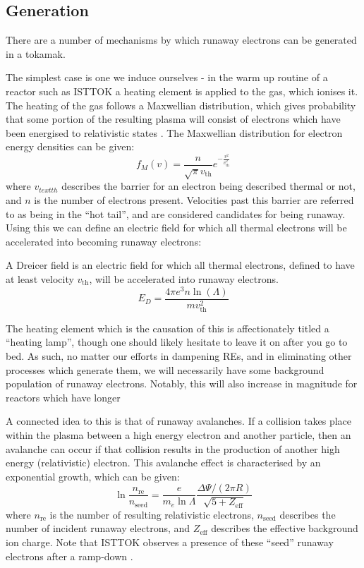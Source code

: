 \subsection{Generation}

There are a number of mechanisms by which runaway electrons can be generated in a tokamak.

The simplest case is one we induce ourselves - in the warm up routine of a reactor such as ISTTOK a heating element 
is applied to the gas, which ionises it. The heating of the gas follows a Maxwellian distribution, which 
gives probability that some portion of the resulting plasma will consist of electrons which have been 
energised to relativistic states \cite{runaway-electrons}. The Maxwellian distribution for electron energy densities 
can be given:
$$f_{M}(v) = \frac{n}{\sqrt{\pi} v_{\text{th}}} e^{-\frac{v^2}{v_{\text{th}}^2}}$$
where $v_{text{th}}$ describes the barrier for an electron being described thermal or not, and $n$ is the number 
of electrons present. Velocities past this barrier are referred to as being in the ``hot tail'', and are considered 
candidates for being runaway. Using this we can define an electric field for which all thermal electrons will be 
accelerated into becoming runaway electrons:
\begin{definition}
    A Dreicer field is an electric field for which all thermal electrons, defined to have at least velocity $v_{\text{th}}$,
    will be accelerated into runaway electrons.
    \begin{equation*}
        E_{D} = \frac{4\pi e^3 n \ln (\Lambda)}{m v_{\text{th}}^2}
    \end{equation*}
\end{definition}
The heating element which is the causation of this is affectionately titled a ``heating lamp'', 
though one should likely hesitate to leave it on after you go to bed. As such, no matter our efforts in dampening 
REs, and in eliminating other processes which generate them, we will necessarily have some background population 
of runaway electrons. Notably, this will also increase in magnitude for reactors which have longer 

A connected idea to this is that of runaway avalanches. If a collision takes place within the plasma between a high 
energy electron and another particle, then an avalanche can occur if that collision results in the production of another 
high energy (relativistic) electron. This avalanche effect is characterised by an exponential growth, which can be given:
\begin{equation*}
    \ln \frac{n_{\text{re}}}{n_{\text{seed}}} = \frac{e}{m_e \ln \Lambda} \frac{\Delta \Psi / (2\pi R)}{\sqrt{5 + Z_{\text{eff}}}}
\end{equation*}
where $n_{\text{re}}$ is the number of resulting relativistic electrons, $n_{\text{seed}}$ describes the 
number of incident runaway electrons, and $Z_{\text{eff}}$ describes the effective background ion charge. Note that ISTTOK observes a 
presence of these ``seed'' runaway electrons after a ramp-down \cite{malaquias-matthew}.

